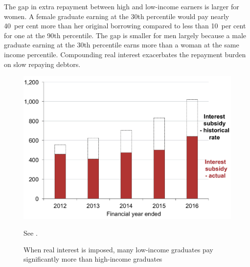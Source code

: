 \documentclass[embargoed]{grattan}
\begin{document}
The gap in extra repayment between high and low-income earners is larger for women.
A female graduate earning at the 30{th} percentile would pay nearly 40~per cent more than her original borrowing compared to less than 10~per cent for one at the 90th percentile.
The gap is smaller for men largely because a male graduate earning at the 30{th} percentile earns more than a woman at the same income percentile.
Compounding real interest exacerbates the repayment burden on slow repaying debtors.


\begin{figure}[!t]
\caption{When real interest is imposed, many low-income graduates pay significantly more than high-income graduates}\label{fig:fig14-when-real-interest-imposed-many-low-income-grads-pay-signif-more-than-high-income-grads}


\includegraphics[page=14]{atlas/Chartpack.pdf}

%
{See .}
\end{figure}
\end{document}

